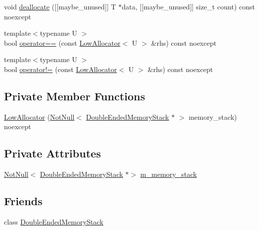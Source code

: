 \begin{DoxyCompactItemize}
\item 
void \mbox{\hyperlink{classmage_1_1_double_ended_memory_stack_1_1_low_allocator_a3c0f2aeae7ca839fa9b07a1d351f1eb5}{deallocate}} (\mbox{[}\mbox{[}maybe\+\_\+unused\mbox{]}\mbox{]} T $\ast$data, \mbox{[}\mbox{[}maybe\+\_\+unused\mbox{]}\mbox{]} size\+\_\+t count) const noexcept
\item 
{\footnotesize template$<$typename U $>$ }\\bool \mbox{\hyperlink{classmage_1_1_double_ended_memory_stack_1_1_low_allocator_a3f46f2f022d96c4019e7f22670c1f001}{operator==}} (const \mbox{\hyperlink{classmage_1_1_double_ended_memory_stack_1_1_low_allocator}{Low\+Allocator}}$<$ U $>$ \&rhs) const noexcept
\item 
{\footnotesize template$<$typename U $>$ }\\bool \mbox{\hyperlink{classmage_1_1_double_ended_memory_stack_1_1_low_allocator_a8bc70b92cfb631d2d24cc7f30dcb2897}{operator!=}} (const \mbox{\hyperlink{classmage_1_1_double_ended_memory_stack_1_1_low_allocator}{Low\+Allocator}}$<$ U $>$ \&rhs) const noexcept
\end{DoxyCompactItemize}
\subsection*{Private Member Functions}
\begin{DoxyCompactItemize}
\item 
\mbox{\hyperlink{classmage_1_1_double_ended_memory_stack_1_1_low_allocator_a4fa86a3c4e05b229f25c46e1bfa163c4}{Low\+Allocator}} (\mbox{\hyperlink{namespacemage_a8769f9d670d6b585ea306cb1062af94b}{Not\+Null}}$<$ \mbox{\hyperlink{classmage_1_1_double_ended_memory_stack}{Double\+Ended\+Memory\+Stack}} $\ast$ $>$ memory\+\_\+stack) noexcept
\end{DoxyCompactItemize}
\subsection*{Private Attributes}
\begin{DoxyCompactItemize}
\item 
\mbox{\hyperlink{namespacemage_a8769f9d670d6b585ea306cb1062af94b}{Not\+Null}}$<$ \mbox{\hyperlink{classmage_1_1_double_ended_memory_stack}{Double\+Ended\+Memory\+Stack}} $\ast$$>$ \mbox{\hyperlink{classmage_1_1_double_ended_memory_stack_1_1_low_allocator_a2921f1244aec0a0ec5427c446a9b35b4}{m\+\_\+memory\+\_\+stack}}
\end{DoxyCompactItemize}
\subsection*{Friends}
\begin{DoxyCompactItemize}
\item 
class \mbox{\hyperlink{classmage_1_1_double_ended_memory_stack_1_1_low_allocator_a10ae729d55b8c0017057250445835680}{Double\+Ended\+Memory\+Stack}}
\end{DoxyCompactItemize}


